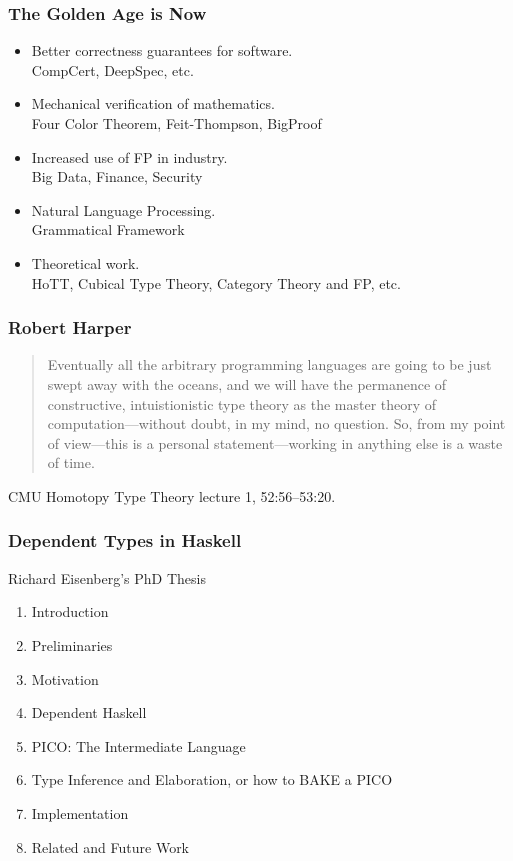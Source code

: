 \documentclass{beamer}
\begin{document}
\begin{frame}\frametitle{The Golden Age is Now}
\begin{itemize}
\item Better correctness guarantees for software.\\
  CompCert, DeepSpec, etc.
\item Mechanical verification of mathematics.\\
  Four Color Theorem, Feit-Thompson, BigProof
\item Increased use of FP in industry.\\
  Big Data, Finance, Security
\item Natural Language Processing.\\
  Grammatical Framework
\item Theoretical work.\\
  HoTT, Cubical Type Theory, Category Theory and FP, etc.
\end{itemize}
\end{frame}

\begin{frame}\frametitle{Robert Harper}
\begin{quote}
Eventually all the arbitrary programming languages are going to be just swept away with the oceans,
and we will have the permanence of constructive, intuistionistic type theory as the master theory
of computation---without doubt, in my mind, no question.  So, from my point of view---this is a personal
statement---working in anything else is a waste of time.
\end{quote}

CMU Homotopy Type Theory lecture 1, 52:56--53:20.
\end{frame}

\begin{frame}\frametitle{Dependent Types in Haskell}
Richard Eisenberg's PhD Thesis  
\begin{enumerate}
\item Introduction
\item Preliminaries
\item Motivation
\item Dependent Haskell
\item PICO: The Intermediate Language
\item Type Inference and Elaboration, or how to BAKE a PICO
\item Implementation
\item Related and Future Work
\end{enumerate}
\end{frame}
\end{document}
